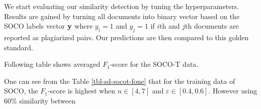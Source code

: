 
We start evaluating our similarity detection by tuning the hyperparameters. Results are gained by turning all documents into binary vector based on the SOCO labels \ie vector $\mathbf{y}$ where $y_i = 1$ and $y_j = 1$ if $i$th and $j$th documents are reported as plagiarized pairs. Our predictions are then compared to this golden standard.

Following table shows averaged $F_1$-score for the SOCO-T data.  

\begin{table}[ht]
\centering
\caption{Average $F_1$-score for $n$-gram length and $\varepsilon$-range for SOCO-T. The smaller the $\varepsilon$-range is, the more similar documents have to be. $F_1$-scores close or over 0.8 are bolded.}
\label{tbl-sd-socot-fone}
\end{table}

\noindent
One can see from the Table \ref{tbl-sd-socot-fone} that for the training data of SOCO, the $F_1$-score is highest when $n \in [4, 7]$ and $\varepsilon \in [0.4, 0.6]$. However using 60\% similarity between 

